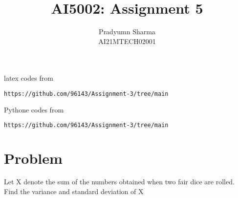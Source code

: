 \documentclass[journal,12pt,twocolumn]{IEEEtran}
\begin{document}
\let\vec\mathbf
\renewcommand{\thefigure}{\theproblem}
\def\putbox#1#2#3{\makebox[0in][l]{\makebox[#1][l]{}\raisebox{\baselineskip}[0in][0in]{\raisebox{#2}[0in][0in]{#3}}}}
     \def\rightbox#1{\makebox[0in][r]{#1}}
     \def\centbox#1{\makebox[0in]{#1}}
     \def\topbox#1{\raisebox{-\baselineskip}[0in][0in]{#1}}
     \def\midbox#1{\raisebox{-0.5\baselineskip}[0in][0in]{#1}}
\vspace{3cm}
\title{AI5002: Assignment 5}
\author{Pradyumn Sharma\\ AI21MTECH02001}
\maketitle
\newpage
\bigskip
\renewcommand{\thefigure}{\theenumi}
\renewcommand{\thetable}{\theenumi}
%
latex codes from 
%
\begin{lstlisting}
https://github.com/96143/Assignment-3/tree/main
\end{lstlisting}
%
Pythone codes from 
%
\begin{lstlisting}
https://github.com/96143/Assignment-3/tree/main
\end{lstlisting}
\section{Problem}
Let X denote the sum of the numbers obtained
when two fair dice are rolled. Find the
variance and standard deviation of X
\end{document}
